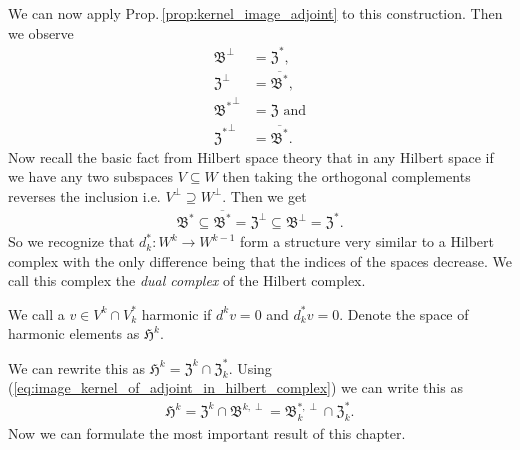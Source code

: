 \documentclass[../main.tex]{subfiles}
\begin{document}
We can now apply Prop.\,\ref{prop:kernel_image_adjoint} to this construction. 
Then we observe 
\begin{align*}
    \mathfrak{B}^\perp &= \mathfrak{Z}^*,
    \\ \mathfrak{Z}^\perp &= \overline{\mathfrak{B}^*},
    \\ \mathfrak{B^*}^\perp &= \mathfrak{Z} \text{ and}
    \\ \mathfrak{Z^*}^\perp &= \overline{\mathfrak{B}^*}.
\end{align*}
Now recall the basic fact from Hilbert space theory that 
in any Hilbert space if we have any two subspaces $V \subseteq W$ then taking the 
orthogonal complements reverses the inclusion i.e.
$V^\perp \supseteq W^\perp$. Then we get 
\begin{align}
    \mathfrak{B}^* \subseteq \overline{\mathfrak{B}^*} 
    = \mathfrak{Z}^\perp  \subseteq \mathfrak{B}^\perp 
    = \mathfrak{Z}^*. \label{eq:image_kernel_of_adjoint_in_hilbert_complex}
\end{align}
So we recognize that $d_k^*:W^k \rightarrow W^{k-1}$ form a structure 
very similar to a Hilbert complex with the only difference being that 
the indices of the spaces decrease. We call this complex the 
\textit{dual complex} of the Hilbert complex.

\begin{definition}
    We call a $v \in V^k \cap V^*_k$ harmonic if $d^k v = 0$ and 
    $d^*_k v = 0$. Denote the space of harmonic elements as 
    $\mathfrak{H}^k$.
\end{definition}
\noindent We can rewrite this as $\mathfrak{H}^k = \mathfrak{Z}^k 
\cap \mathfrak{Z}^*_k$. Using 
(\ref{eq:image_kernel_of_adjoint_in_hilbert_complex}) we can write this as
\begin{align*}
    \mathfrak{H}^k = \mathfrak{Z}^k \cap \mathfrak{B}^{k,\perp}
         = \mathfrak{B}_k^{*,\perp} \cap \mathfrak{Z}^*_k.
\end{align*}
Now we can formulate the most important 
result of this chapter. 
\end{document}
